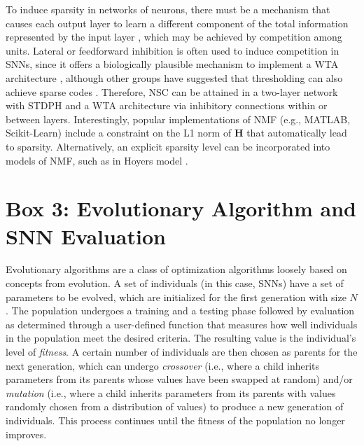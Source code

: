 To induce sparsity in networks of neurons, there must be a mechanism that causes each output layer to learn a different component of the total information represented by the input layer \citep{Foldiak1990}, which may be achieved by competition among units. Lateral or feedforward inhibition is often used to induce competition in SNNs, since it offers a biologically plausible mechanism to implement a \ac{WTA} architecture \citep{Coultrip1992}, although other groups have suggested that thresholding can also achieve sparse codes \citep{Rozell2008}. Therefore, \ac{NSC} can be attained in a two-layer network with \ac{STDPH} and a \ac{WTA} architecture via inhibitory connections within or between layers. Interestingly, popular implementations of \ac{NMF} (e.g., MATLAB, Scikit-Learn) include a constraint on the L1 norm of \textbf{H} that automatically lead to sparsity. Alternatively, an explicit sparsity level can be incorporated into models of \ac{NMF}, such as in Hoyer\textsc{}s model \citep{Hoyer2004}.


\section{Box 3: Evolutionary Algorithm and SNN Evaluation}
\label{box:EA}
Evolutionary algorithms are a class of optimization algorithms loosely based on concepts from evolution. A set of individuals (in this case, \acp{SNN}) have a set of parameters to be evolved, which are initialized for the first generation with size $N$. The population undergoes a training and a testing phase followed by evaluation as determined through a user-defined function that measures how well individuals in the population meet the desired criteria. The resulting value is the individual's level of \emph{fitness}.
A certain number of individuals are then chosen as parents for the next generation,
which can undergo \emph{crossover}
(i.e., where a child inherits parameters from its parents whose values
have been swapped at random)
and/or \emph{mutation}
(i.e., where a child inherits parameters from its parents with values
randomly chosen from a distribution of values)
to produce a new generation of individuals.
This process continues until the fitness of the population no longer improves.

